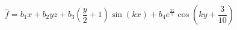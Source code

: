 $$
\hat f = b_1 x + b_2 y z + b_3 \left(\frac{y}{2} + 1\right) \sin{\left(k x \right)} + b_4 e^{\frac{2 z}{5}} \cos{\left(k y + \frac{3}{10} \right)}
$$
